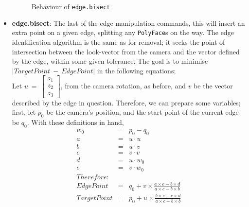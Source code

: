 \documentclass[a4paper,10pt]{article}
\begin{document}
\begin{itemize}
\begin{figure}
  \begin{center}
  \hspace{-10px}
  \caption{Behaviour of \texttt{edge.bisect}}
  \label{edgesplit}
  \end{center}
\end{figure}

\item{\textbf{edge.bisect}: The last of the edge manipulation commands, this will insert an extra point on a given edge, splitting any \texttt{PolyFace}s on the way. The edge identification algorithm is the same as for removal; it seeks the point of intersection between the look-vector from the camera and the vector defined by the edge, within some given tolerance. The goal is to minimise $|TargetPoint ~-~ EdgePoint|$ in the following equations;
\\	
        
Let $u ~=~ \left[ 
  \begin{array}{c}
    z_1 \\ 
    z_2 \\ 
    z_3 
  \end{array}\right]$, from the camera rotation, as before, and $v$ be the vector described by the edge in question. Therefore, we can prepare some variables; first, let $p_0$ be the camera's position, and the start point of the current edge be $q_0$. With these definitions in hand,
\begin{eqnarray*}
  w_0 &=& p_0 - q_0 \\
  a &=& u \cdot u \\
  b &=& u \cdot v \\
  c &=& v \cdot v \\
  d &=& u \cdot w_0 \\
  e &=& v \cdot w_0 \\
  Therefore:\\
  EdgePoint &=& q_0 + v \times \frac{a \times e - b \times d}{a \times c - b \times b} \\
  TargetPoint &=& p_0 + u \times \frac{b \times e - c \times d}{a \times c - b \times b}
\end{eqnarray*}

}
\end{itemize}
\end{document}
